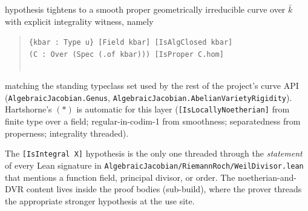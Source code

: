 \begin{itemize}
    hypothesis tightens to a smooth proper geometrically irreducible curve
    over \(\bar k\) with explicit integrality witness, namely
    \begin{quote}
      \texttt{\{kbar : Type u\} [Field kbar] [IsAlgClosed kbar]\\
       (C : Over (Spec (.of kbar))) [IsProper C.hom]\\
       \phantom{}\\
       \phantom{}}
    \end{quote}
    matching the standing typeclass set used by the rest of the project's
    curve API (\texttt{AlgebraicJacobian.Genus},
    \texttt{AlgebraicJacobian.AbelianVarietyRigidity}). Hartshorne's \((*)\) is
    automatic for this layer (\texttt{[IsLocallyNoetherian]} from finite type
    over a field; regular-in-codim-1 from smoothness; separatedness from
    properness; integrality threaded).
\end{itemize}
\noindent
The \texttt{[IsIntegral X]} hypothesis is the only one threaded through the
\emph{statement} of every Lean signature in
\texttt{AlgebraicJacobian/RiemannRoch/WeilDivisor.lean} that mentions a
function field, principal divisor, or order. The noetherian-and-DVR
content lives inside the proof bodies (sub-build), where the prover threads
the appropriate stronger hypothesis at the use site.
